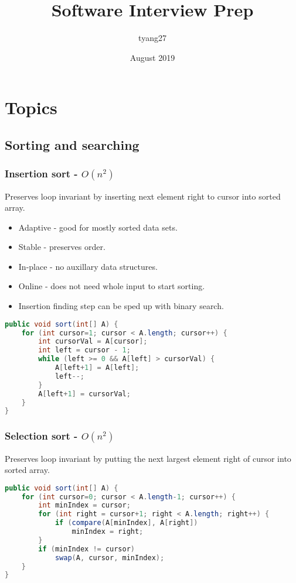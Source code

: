 \documentclass{article}
\title{Software Interview Prep}
\author{tyang27}
\date{August 2019}
\begin{document}
\maketitle

\section{Topics}
\subsection{Sorting and searching}
\subsubsection{Insertion sort - $O(n^2)$}
Preserves loop invariant by inserting next element right to cursor into sorted array.
\begin{itemize}
    \item Adaptive - good for mostly sorted data sets.
    \item Stable - preserves order.
    \item In-place - no auxillary data structures.
    \item Online - does not need whole input to start sorting.
    \item Insertion finding step can be sped up with binary search.
\end{itemize}
\begin{lstlisting}[language=java]
public void sort(int[] A) {
    for (int cursor=1; cursor < A.length; cursor++) {
        int cursorVal = A[cursor];
        int left = cursor - 1;
        while (left >= 0 && A[left] > cursorVal) {
            A[left+1] = A[left];
            left--;
        }
        A[left+1] = cursorVal;
    }
}
\end{lstlisting}

\subsubsection{Selection sort - $O(n^2)$}
Preserves loop invariant by putting the next largest element right of cursor into sorted array.
\begin{lstlisting}[language=java]
public void sort(int[] A) {
    for (int cursor=0; cursor < A.length-1; cursor++) {
        int minIndex = cursor;
        for (int right = cursor+1; right < A.length; right++) {
            if (compare(A[minIndex], A[right])
                minIndex = right;
        }
        if (minIndex != cursor)
            swap(A, cursor, minIndex);
    }
}
\end{lstlisting}
\end{document}

